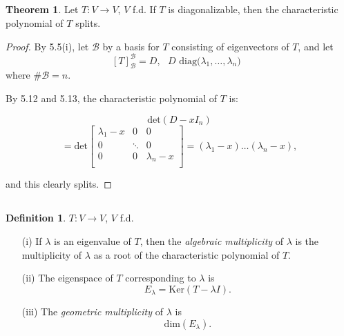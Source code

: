 \documentclass[a4paper,10pt]{article}
\theoremstyle{definition}
\newtheorem{theorem}{Theorem}[section]
\newtheorem{definition}{Definition}[section]
\begin{document}
\subsection{}
\begin{theorem}
	Let $T : V \to V$, $V$ f.d. If $T$ is diagonalizable, then the
	characteristic polynomial of $T$ splits.
\end{theorem}
\begin{proof}
	By 5.5(i), let $\mathcal{B}$ by a basis for $T$ consisting of eigenvectors
	of $T$, and let 
	$$[T]_\mathcal{B}^\mathcal{B} = D, \text{ $D$ diag($\lambda_1,
	\ldots,\lambda_n)$ }$$
	where $\# \mathcal{B} = n$.

	By 5.12 and 5.13, the characteristic polynomial of $T$ is:

	$$\text{det} (D - xI_n)$$
	$$= \text{det}
	\begin{bmatrix}
		\lambda_1 - x & 0 & 0 \\
		0 & \ddots & 0 \\
		0 & 0 & \lambda_n - x\\
	\end{bmatrix}
	= (\lambda_1 - x)\ldots (\lambda_n - x)
	,
	$$

	and this clearly splits.
\end{proof}	

\subsection{}
\begin{definition}
	$T : V \to V$, $V$ f.d. 
	\begin{enumerate}
		\item[(i)] If $\lambda$ is an eigenvalue of $T$, then the \textit{algebraic
			multiplicity} of $\lambda$ is the multiplicity of $\lambda$ as a root
			of the characteristic polynomial of $T$.
		\item[(ii)] The eigenspace of $T$ corresponding to $\lambda$ is
			$$E_\lambda = \text{Ker}(T - \lambda I).$$
		\item[(iii)] The \textit{geometric multiplicity} of $\lambda$ is 
			$$\text{dim}(E_\lambda).$$
	\end{enumerate}
\end{definition}
\end{document}
